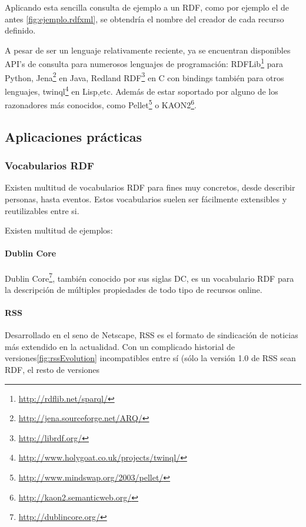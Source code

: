 Aplicando esta sencilla consulta de ejemplo a un RDF, como por ejemplo el de 
antes \ref{fig:ejemplo.rdfxml}, se obtendría el nombre del creador de cada recurso
definido.

A pesar de ser un lenguaje relativamente reciente, ya se encuentran disponibles
API's de consulta para numerosos lenguajes de programación: 
RDFLib\footnote{\url{http://rdflib.net/sparql/}} para Python, 
Jena\footnote{\url{http://jena.sourceforge.net/ARQ/}} en Java, 
Redland RDF\footnote{\url{http://librdf.org/}} en C con bindings también para 
otros lenguajes, twinql\footnote{\url{http://www.holygoat.co.uk/projects/twinql/}} 
en Lisp,etc. Además de estar soportado por alguno de los razonadores más conocidos, 
como Pellet\footnote{\url{http://www.mindswap.org/2003/pellet/}} o 
KAON2\footnote{\url{http://kaon2.semanticweb.org/}}.

\subsection{Aplicaciones prácticas}

\subsubsection{Vocabularios RDF}

Existen multitud de vocabularios RDF para fines muy concretos, desde describir
personas, hasta eventos. Estos vocabularios suelen ser fácilmente extensibles y 
reutilizables entre si.

Existen multitud de ejemplos:

\paragraph{Dublin Core\label{sec:dc}}

Dublin Core\footnote{\url{http://dublincore.org/}}, también conocido por sus siglas DC,
es un vocabulario RDF para la descripción de múltiples propiedades de todo tipo de 
recursos online.

\paragraph{RSS}

Desarrollado en el seno de Netscape, RSS es el formato de sindicación de noticias
más extendido en la actualidad. Con un complicado historial de versiones\ref{fig:rssEvolution} 
incompatibles entre sí (sólo la versión 1.0 de RSS sean
RDF, el resto de versiones 

